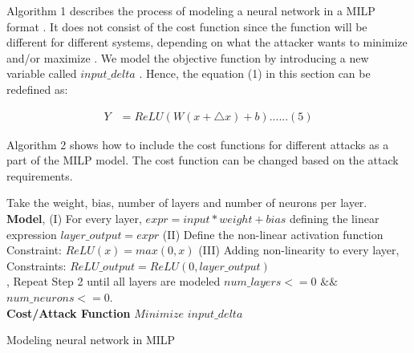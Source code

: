 Algorithm 1 describes the process of modeling a neural network in a MILP format . It does not consist of the cost function since the function will be different for different systems, depending on what the attacker wants to minimize and/or maximize . 
We model the objective function by introducing a new variable called $input\_delta$ . Hence, the equation (1) 
in this section can be redefined as:

\begin{align}
Y &=  ReLU(W(x + \bigtriangleup  x ) + b) ...... (5)
\end{align}

Algorithm 2 shows how to include the cost functions for different attacks as a part of the MILP model. The cost function can be changed based on the attack requirements. 
\begin{algorithm}
	Take the weight, bias, number of layers and number of neurons per layer. \\
	
	\textbf{Model}, \linebreak
	(I) For every  layer,  $expr = input * weight + bias$
	\linebreak 
	defining the linear expression
	\linebreak
	$layer\_output = expr$
	\linebreak
	(II) Define the non-linear activation function 
	\linebreak 
	\qquad Constraint: $ReLU(x) = max (0,x)$
	\linebreak
	(III) Adding non-linearity to every layer,
	\linebreak
	Constraints: $ReLU\_output = ReLU(0, layer\_output)$\\, 
	Repeat Step 2 until all layers are modeled 
	\linebreak
	$num\_layers < = 0$   $ \&\& $ 
	$ num\_neurons < = 0 $.\\
	
	\textbf{Cost/Attack Function} \linebreak
	$Minimize $  $input\_delta$
	\caption{Modeling neural network in MILP}
	\label{algo:b}
\end{algorithm}

